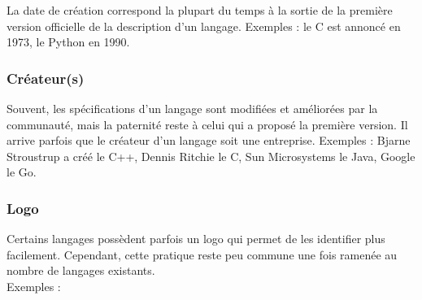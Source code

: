 La date de création correspond la plupart du temps à la sortie de la première version officielle de la description d'un langage. Exemples : le C est annoncé en 1973, le Python en 1990.

\subsubsection{Créateur(s)}
\label{createur}

Souvent, les spécifications d'un langage sont modifiées et améliorées par la communauté, mais la paternité reste à celui qui a proposé la première version. Il arrive parfois que le créateur d'un langage soit une entreprise. Exemples : Bjarne Stroustrup a créé le C++, 	Dennis Ritchie le C, Sun Microsystems le Java, Google le Go.

\subsubsection{Logo}
\label{logo}

Certains langages possèdent parfois un logo qui permet de les identifier plus facilement. Cependant, cette pratique reste peu commune une fois ramenée au nombre de langages existants.\\

Exemples :\\

